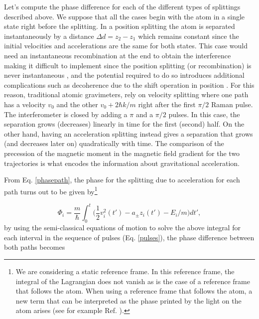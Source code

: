 \documentclass{article}
\begin{document}
Let's compute the phase difference for each of the different types of splittings described above. We suppose that all the cases begin with the atom in a single state right before the splitting. In a position splitting the atom is separated instantaneously by a distance $\Delta d=z_2-z_1$ which remains constant since the initial velocities and accelerations are the same for both states. This case would need an instantaneous recombination at the end to obtain the interference making it difficult to implement since the position splitting (or recombination) is never instantaneous \cite{quantum_brachistochrones_PhysRevX.11.011035}, and the potential required to do so introduces additional complications such as decoherence due to the shift operation in position \cite{Andreas_digital_interferometer}. For this reason, traditional atomic gravimeters, rely on velocity splitting \cite{Peters_2001} where one path has a velocity $v_0$ and the other $v_0+2 \hbar k/m$ right after the first $\pi/2$ Raman pulse. The interferometer is closed by adding a $\pi$ and a $\pi/2$ pulses. In this case, the separation grows (decreases) linearly in time for the first (second) half. On the other hand, having an acceleration splitting instead gives a separation that grows (and decreases later on) quadratically with time. The comparison of the precession of the magnetic moment in the magnetic field gradient for the two trajectories is what encodes the information about gravitational acceleration. 

From Eq. \ref{phasepath}, the phase for the splitting due to acceleration for each path turns out to be given by\footnote{We are considering a static reference frame. In this reference frame, the integral of the Lagrangian does not vanish as is the case of a reference frame that follows the atom. When using a reference frame that follows the atom, a new term that can be interpreted as the phase printed by the light on the atom arises (see for example Ref. \cite{Peters_2001}).}

\begin{equation}
\label{phasepath}
\Phi_i = \frac{m}{\hbar} \int_{0}^{t} \bigg( \frac{1}{2} v_{i}^{2}(t') - a_{\pm} z_{i}(t') - E_{i}/m \bigg) dt',
\end{equation}
%
by using the semi-classical equations of motion to solve the above integral for each interval in the sequence of pulses (Eq. \ref{pulses}), the phase difference between both paths becomes
\end{document}
